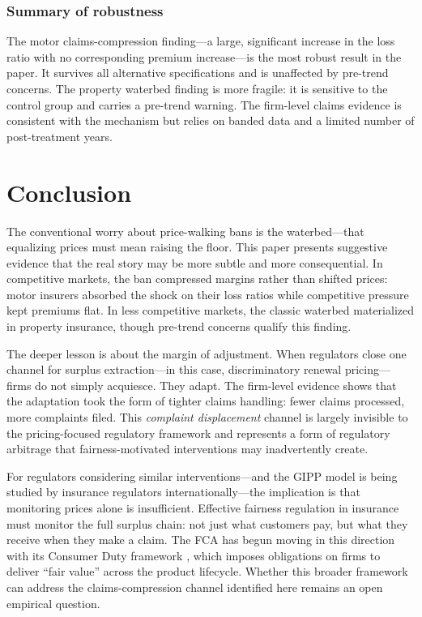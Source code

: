 \documentclass[12pt]{article}
\begin{document}
\subsubsection*{Summary of robustness} The motor claims-compression finding---a large, significant increase in the loss ratio with no corresponding premium increase---is the most robust result in the paper. It survives all alternative specifications and is unaffected by pre-trend concerns. The property waterbed finding is more fragile: it is sensitive to the control group and carries a pre-trend warning. The firm-level claims evidence is consistent with the mechanism but relies on banded data and a limited number of post-treatment years.




\section{Conclusion}
\label{sec:conclusion}

The conventional worry about price-walking bans is the waterbed---that equalizing prices must mean raising the floor. This paper presents suggestive evidence that the real story may be more subtle and more consequential. In competitive markets, the ban compressed margins rather than shifted prices: motor insurers absorbed the shock on their loss ratios while competitive pressure kept premiums flat. In less competitive markets, the classic waterbed materialized in property insurance, though pre-trend concerns qualify this finding.

The deeper lesson is about the margin of adjustment. When regulators close one channel for surplus extraction---in this case, discriminatory renewal pricing---firms do not simply acquiesce. They adapt. The firm-level evidence shows that the adaptation took the form of tighter claims handling: fewer claims processed, more complaints filed. This \textit{complaint displacement} channel is largely invisible to the pricing-focused regulatory framework and represents a form of regulatory arbitrage that fairness-motivated interventions may inadvertently create.

For regulators considering similar interventions---and the GIPP model is being studied by insurance regulators internationally---the implication is that monitoring prices alone is insufficient. Effective fairness regulation in insurance must monitor the full surplus chain: not just what customers pay, but what they receive when they make a claim. The FCA has begun moving in this direction with its Consumer Duty framework \citep{FCA_PS22_9}, which imposes obligations on firms to deliver ``fair value'' across the product lifecycle. Whether this broader framework can address the claims-compression channel identified here remains an open empirical question.
\end{document}
